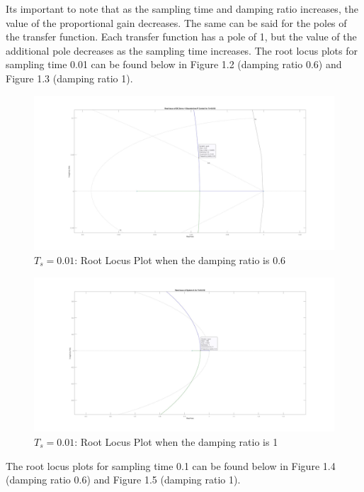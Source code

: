 \documentclass[stu, a4paper, 12pt, floatsintext]{apa7}
\numberwithin{figure}{section}
\numberwithin{table}{section}
\numberwithin{equation}{section}
\begin{document}
Its important to note that as the sampling time and damping ratio increases, the value of the proportional gain decreases. The same can be said for the poles of the transfer function. Each transfer function has a pole of 1, but the value of the additional pole decreases as the sampling time increases.
The root locus plots for sampling time 0.01 can be found below in Figure 1.2 (damping ratio 0.6) and Figure 1.3 (damping ratio 1). 
\begin{figure}[H]
    \caption{$T_s = 0.01$: Root Locus Plot when the damping ratio is 0.6}
    \label{fig:0.01_Ts_damping_0.6}
    \centering
    \includegraphics[width=1.1\textwidth]{pictures/task2_0.01_damping_0.6.jpg}
\end{figure}
\begin{figure}[H]
    \caption{$T_s = 0.01$: Root Locus Plot when the damping ratio is 1}
    \label{fig:0.01_Ts_damping_1}
    \centering
    \includegraphics[width=1.1\textwidth]{pictures/task2_0.01_damping_1.jpg}
\end{figure}
The root locus plots for sampling time 0.1 can be found below in Figure 1.4 (damping ratio 0.6) and Figure 1.5 (damping ratio 1). 
\end{document}
